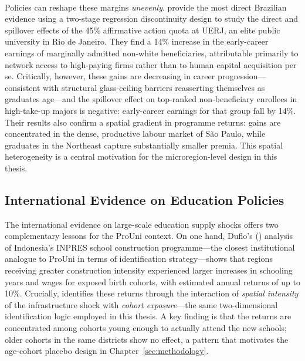 \paragraph{}
Policies can reshape these margins \emph{unevenly}.  provide the most direct Brazilian evidence using a two-stage regression discontinuity design to study the direct and spillover effects of the 45\% affirmative action quota at UERJ, an elite public university in Rio de Janeiro. They find a 14\% increase in the early-career earnings of marginally admitted non-white beneficiaries, attributable primarily to network access to high-paying firms rather than to human capital acquisition per se. Critically, however, these gains are decreasing in career progression---consistent with structural glass-ceiling barriers reasserting themselves as graduates age---and the spillover effect on top-ranked non-beneficiary enrollees in high-take-up majors is negative: early-career earnings for that group fall by 14\%. Their results also confirm a spatial gradient in programme returns: gains are concentrated in the dense, productive labour market of São Paulo, while graduates in the Northeast capture substantially smaller premia. This spatial heterogeneity is a central motivation for the microregion-level design in this thesis.



\subsection{International Evidence on Education Policies}
\label{subsec:international_evidence}

The international evidence on large-scale education supply shocks offers two complementary lessons for the ProUni context. On one hand, Duflo's (\citeyear{Duflo2001}) analysis of Indonesia's INPRES school construction programme---the closest institutional analogue to ProUni in terms of identification strategy---shows that regions receiving greater construction intensity experienced larger increases in schooling years and wages for exposed birth cohorts, with estimated annual returns of up to 10\%. Crucially,  identifies these returns through the interaction of \emph{spatial intensity} of the infrastructure shock with \emph{cohort exposure}---the same two-dimensional identification logic employed in this thesis. A key finding is that the returns are concentrated among cohorts young enough to actually attend the new schools; older cohorts in the same districts show no effect, a pattern that motivates the age-cohort placebo design in Chapter~\ref{sec:methodology}.

